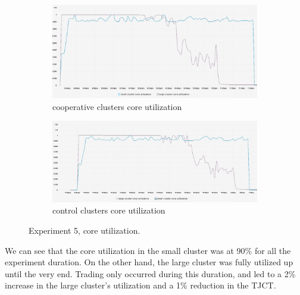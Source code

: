 \begin{figure}[H]
\centering
\begin{subfigure}{.5\textwidth}
  \centering
  \includegraphics[width=.9\linewidth]{./figures/experiment-five/alibaba-core-coop.png}
  \caption{cooperative clusters core utilization}
  \label{fig:exp5coopcore}
\end{subfigure}%
\begin{subfigure}{.5\textwidth}
  \centering
  \includegraphics[width=.9\linewidth]{./figures/experiment-five/alibaba-core-control.png}
  \caption{control clusters core utilization}
  \label{fig:exp5controlcore}
\end{subfigure}
\caption{Experiment 5, core utilization.}
\label{fig:exp5coreutil}
\end{figure}

We can see that the core utilization in the small cluster was at 90\% for all
the experiment duration. On the other hand, the large cluster was fully
utilized up until the very end. Trading only occurred during this duration, and
led to a 2\% increase in the large cluster's utilization and a 1\% reduction in
the TJCT.

